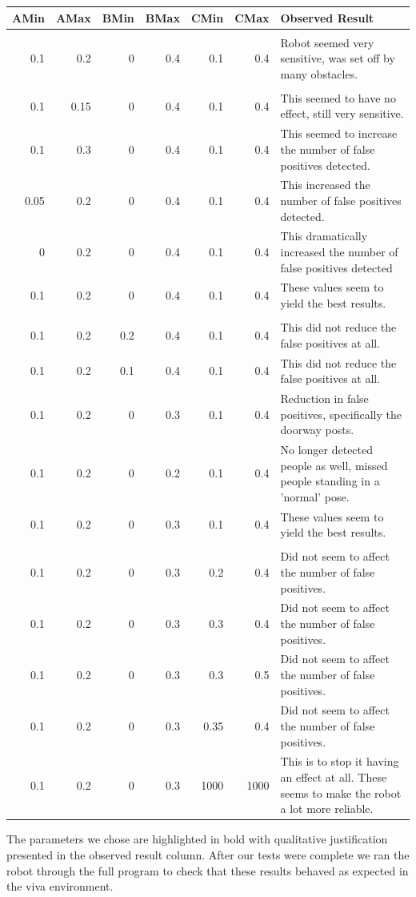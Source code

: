\documentclass{article}
\begin{document}
\begin{longtable}{r|r|r|r|r|r|p{8cm}}
AMin & AMax & BMin & BMax & CMin & CMax & Observed Result\\
\hline
 & & & & & & \\

0.1 & 0.2 & 0 & 0.4 & 0.1 & 0.4 & Robot seemed very sensitive, was set off by many obstacles.\\

 & & & & & & \\
 0.1 & 0.15 & 0 & 0.4 & 0.1 & 0.4 & This seemed to have no effect, still very sensitive.\\[1ex]
 0.1 & 0.3 & 0 & 0.4 & 0.1 & 0.4 & This seemed to increase the number of false positives detected.\\
 0.05 & 0.2 & 0 & 0.4 & 0.1 & 0.4 & This increased the number of false positives detected.\\[1ex]
 0 & 0.2 & 0 & 0.4 & 0.1 & 0.4 & This dramatically increased the number of false positives detected\\
 0.1 & 0.2 & 0 & 0.4 & 0.1 & 0.4 & These values seem to yield the best results.\\ [1ex]
 & & & & & & \\ 
 0.1 & 0.2 & 0.2 & 0.4 & 0.1 & 0.4 & This did not reduce the false positives at all.\\[1ex]
 0.1 & 0.2 & 0.1 & 0.4 & 0.1 & 0.4 & This did not reduce the false positives at all.\\[1ex]
 0.1 & 0.2 & 0 & 0.3 & 0.1 & 0.4 & Reduction in false positives, specifically the doorway posts.\\
 0.1 & 0.2 & 0 & 0.2 & 0.1 & 0.4 & No longer detected people as well, missed people standing in a 'normal' pose.\\
 0.1 & 0.2 & 0 & 0.3 & 0.1 & 0.4 & These values seem to yield the best results.\\ [1ex]
 & & & & & & \\
 0.1 & 0.2 & 0 & 0.3 & 0.2 & 0.4 & Did not seem to affect the number of false positives.\\[1ex]
 0.1 & 0.2 & 0 & 0.3 & 0.3 & 0.4 & Did not seem to affect the number of false positives.\\[1ex]
 0.1 & 0.2 & 0 & 0.3 & 0.3 & 0.5 & Did not seem to affect the number of false positives.\\[1ex]
 0.1 & 0.2 & 0 & 0.3 & 0.35 & 0.4 & Did not seem to affect the number of false positives.\\[1ex]
 
 0.1 & 0.2 & 0 & 0.3 & 1000 & 1000 & This is to stop it having an effect at all. These seems to make the robot a lot more reliable.\\
 \end{longtable}
	The parameters we chose are highlighted in bold with qualitative justification presented in the observed result column. After our tests were complete we ran the robot through the full program to check that these results behaved as expected in the viva environment.
	
\end{document}
